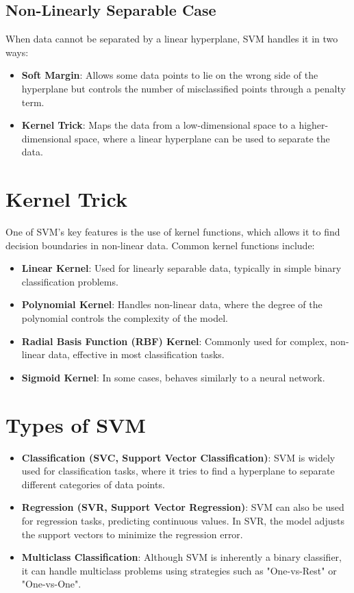 \documentclass{article}
\begin{document}
	\subsection{Non-Linearly Separable Case}
	When data cannot be separated by a linear hyperplane, SVM handles it in two ways:
	
	\begin{itemize}
		\item \textbf{Soft Margin}: Allows some data points to lie on the wrong side of the hyperplane but controls the number of misclassified points through a penalty term.
		\item \textbf{Kernel Trick}: Maps the data from a low-dimensional space to a higher-dimensional space, where a linear hyperplane can be used to separate the data.
	\end{itemize}
	
	\section{Kernel Trick}
	
	One of SVM’s key features is the use of kernel functions, which allows it to find decision boundaries in non-linear data. Common kernel functions include:
	
	\begin{itemize}
		\item \textbf{Linear Kernel}: Used for linearly separable data, typically in simple binary classification problems.
		\item \textbf{Polynomial Kernel}: Handles non-linear data, where the degree of the polynomial controls the complexity of the model.
		\item \textbf{Radial Basis Function (RBF) Kernel}: Commonly used for complex, non-linear data, effective in most classification tasks.
		\item \textbf{Sigmoid Kernel}: In some cases, behaves similarly to a neural network.
	\end{itemize}
	
	\section{Types of SVM}
	
	\begin{itemize}
		\item \textbf{Classification (SVC, Support Vector Classification)}: SVM is widely used for classification tasks, where it tries to find a hyperplane to separate different categories of data points.
		\item \textbf{Regression (SVR, Support Vector Regression)}: SVM can also be used for regression tasks, predicting continuous values. In SVR, the model adjusts the support vectors to minimize the regression error.
		\item \textbf{Multiclass Classification}: Although SVM is inherently a binary classifier, it can handle multiclass problems using strategies such as "One-vs-Rest" or "One-vs-One".
	\end{itemize}
	
\end{document}

